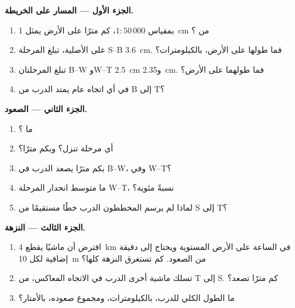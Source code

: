 \begin{problem}
\noindent\textbf{الجزء الأول --- المسار على الخريطة.}\par\nopagebreak
\begin{enumerate}[beginpenalty=10000]
  \item بمقياس $1 : 50\,000$، كم مترًا على الأرض يمثل \qty{1}{cm}
        من ؟
  \item على  الأصلية، تبلغ المرحلة S--B \qty{3.6}{cm}. فما طولها
        على الأرض، بالكيلومترات؟
  \item تبلغ المرحلتان B--W وW--T \qty{2.5}{cm} و\qty{2.35}{cm}.
        فما طولهما على الأرض؟
  \item في أي اتجاه عام يمتد الدرب من B إلى T؟
\end{enumerate}

\noindent\textbf{الجزء الثاني --- الصعود.}\par\nopagebreak
\begin{enumerate}[resume, beginpenalty=10000]
  \item ما  ؟
  \item أي مرحلة تنزل؟ وبكم مترًا؟
  \item بكم مترًا يصعد الدرب في B--W، وفي W--T؟
  \item ما متوسط انحدار المرحلة W--T، نسبةً مئوية؟
  \item لماذا لم يرسم المخططون الدرب خطًا مستقيمًا من S
        إلى T؟
\end{enumerate}

\noindent\textbf{الجزء الثالث --- النزهة.}\par\nopagebreak
\begin{enumerate}[resume, beginpenalty=10000]
  \item افترض أن ماشيًا يقطع \qty{4}{km} في الساعة على الأرض المستوية
        ويحتاج إلى دقيقة إضافية لكل \qty{10}{m} من الصعود. كم تستغرق
        النزهة كلها؟
  \item تسلك ماشية أخرى الدرب في الاتجاه المعاكس، من T إلى S.
        كم مترًا تصعد؟
  \item ما الطول الكلي للدرب، بالكيلومترات، ومجموع صعوده،
        بالأمتار؟
\end{enumerate}
\end{problem}
